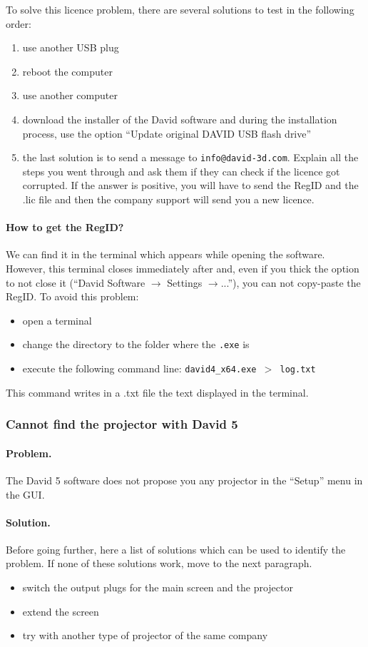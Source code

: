 \documentclass[11pt]{article}
\begin{document}
To solve this licence problem, there are several solutions to test in the following order:
\begin{enumerate}
\item use another USB plug
\item reboot the computer
\item use another computer
\item download the installer of the David software and during the installation process, use the option ``Update original DAVID USB flash drive'' 
\item the last solution is to send a message to { \tt info@david-3d.com}.
Explain all the steps you went through and ask them if they can check if the licence got corrupted.
If the answer is positive, you will have to send the RegID and the .lic file and then the company support will send you a new licence.
\end{enumerate}

\paragraph{How to get the RegID?}
We can find it in the terminal which appears while opening the software.
However, this terminal closes immediately after and, even if you thick the option to not close it (``David Software $\rightarrow$ Settings $\rightarrow$...''), you can not copy-paste the RegID.
To avoid this problem:
\begin{itemize}
\item open a terminal
\item change the directory to the folder where the {\tt .exe} is
\item execute the following command line: {\tt david4\_x64.exe $>$ log.txt}
\end{itemize}
This command writes in a .txt file the text displayed in the terminal.

\subsubsection{Cannot find the projector with David 5}

\paragraph{Problem.}
The David 5 software does not propose you any projector in the ``Setup'' menu in the GUI.

\paragraph{Solution.}
Before going further, here a list of solutions which can be used to identify the problem.
If none of these solutions work, move to the next paragraph.
\begin{itemize}
\item switch the output plugs for the main screen and the projector
\item extend the screen
\item try with another type of projector of the same company
\end{itemize}
\end{document}
